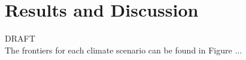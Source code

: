  
\section{Results and Discussion}
 
DRAFT\\
The frontiers for each climate scenario can be found in Figure $\ldots$
